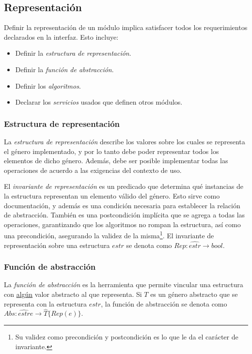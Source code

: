 \documentclass{article}
\begin{document}
\subsection{Representación}

Definir la representación de un módulo implica satisfacer todos los requerimientos declarados en la interfaz. Esto incluye:
\begin{itemize}
    \item Definir la \textit{estructura de representación}.
    \item Definir la \textit{función de abstracción}.
    \item Definir los \textit{algoritmos}.
    \item Declarar los \textit{servicios} usados que definen otros módulos.
\end{itemize}

\subsubsection{Estructura de representación}

La \textit{estructura de representación} describe los valores sobre los cuales se representa el género implementado, y por lo tanto debe poder representar todos los elementos de dicho género. Además, debe ser posible implementar todas las operaciones de acuerdo a las exigencias del contexto de uso.

El \textit{invariante de representación} es un predicado que determina qué instancias de la estructura representan un elemento válido del género. Esto sirve como documentación, y además es una condición necesaria para establecer la relación de abstracción. También es una postcondición implícita que se agrega a todas las operaciones, garantizando que los algoritmos no rompan la estructura, así como una precondición, asegurando la validez de la misma\footnote{Su validez como precondición y postcondición es lo que le da el carácter de invariante.}. El invariante de representación sobre una estructura $estr$ se denota como $Rep: \hat{estr} \rightarrow bool$.

\subsubsection{Función de abstracción}

La \textit{función de abstracción} es la herramienta que permite vincular una estructura con \underline{algún} valor abstracto al que representa. Si $T$ es un género abstracto que se representa con la estructura $estr$, la función de abstracción se denota como $Abs: \hat{estr} e \rightarrow \hat{T} \{Rep(e)\}$.
\end{document}
